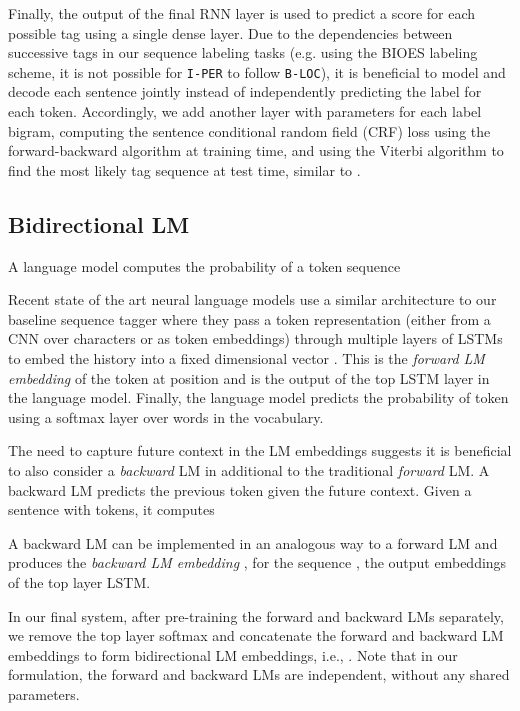 \documentclass[11pt,a4paper]{article}
\begin{document}
Finally, the output of the final RNN layer  is used to predict a score for each possible
tag using a single dense layer.  Due to the dependencies between successive tags in our sequence labeling tasks
(e.g. using the BIOES labeling scheme, it is not possible for \texttt{I-PER} to follow \texttt{B-LOC}), it
is beneficial to model and decode each sentence jointly instead of independently predicting the label for each token.
Accordingly, we add another layer with parameters for each label bigram, computing the sentence conditional random field (CRF) loss
\citep{CRF:Lafferty2001} using the forward-backward algorithm at training time, and using the Viterbi algorithm to find the most likely tag sequence at test time, similar to \citet{NLPfromScratch:Collobert2011}.

\subsection{Bidirectional LM}
\label{sec:bidirectional_lm}
A language model computes the probability of a token sequence 

Recent state of the art neural language models \citep{Jzefowicz2016ExploringTL}
use a similar architecture to our baseline sequence tagger 
where they pass a token representation (either
from a CNN over characters or as token embeddings) through multiple layers of LSTMs to embed
the history  into a fixed dimensional vector . This is the \textit{forward LM embedding} of the token at position  and is the output of the top LSTM layer in the language model. 
Finally, the language model predicts the probability of token  using
a softmax layer over words in the vocabulary.

The need to capture future context in the LM embeddings suggests it
is beneficial to also consider a \textit{backward} LM in additional
to the traditional \textit{forward} LM.  A backward LM predicts the previous token given the future context.  Given a sentence with  tokens, it computes

A backward LM can be implemented in an analogous way to a forward LM and produces the \textit{backward LM embedding} , for the sequence , the output embeddings of the top layer LSTM.


In our final system, after pre-training the forward and backward LMs separately, we remove the top layer
softmax and concatenate the forward and backward LM embeddings to form bidirectional LM embeddings, i.e., 
.
Note that in our formulation, the forward and backward LMs are independent, without
any shared parameters.
\end{document}
